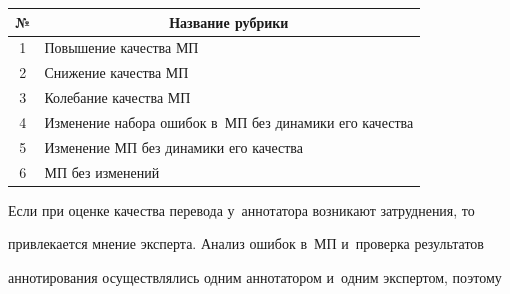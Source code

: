 \begin{table}\small %


\begin{center}


\parbox{290pt}{


}





\vspace*{2ex}





\begin{tabular}{|c|l|}


\hline


\textbf{№}&\multicolumn{1}{c|}{\textbf{Название рубрики}}\\


\hline


1&Повышение качества МП\\


2&Снижение качества МП\\


3&Колебание качества МП\\


4&Изменение набора ошибок в~МП без динамики его качества\\


5&Изменение МП без динамики его качества\\


6&МП без изменений\\


\hline


\end{tabular}


\end{center}


\vspace*{-9pt}


\end{table}


  


  Если при оценке качества перевода у~аннотатора возникают затруднения, то 


привлекается мнение эксперта. Анализ ошибок в~МП и~проверка результатов 


аннотирования осуществлялись одним аннотатором и~одним экспертом, поэтому 


